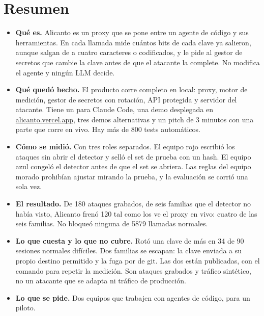 
\section{Resumen}\label{sec:resumen}

\begin{itemize}
  \item \textbf{Qué es.} Alicanto es un proxy que se pone entre un agente de código y sus herramientas.
    En cada llamada mide cuántos bits de cada clave ya salieron, aunque salgan de a cuatro caracteres o
    codificados, y le pide al gestor de secretos que cambie la clave antes de que el atacante la
    complete. No modifica el agente y ningún LLM decide.
  \item \textbf{Qué quedó hecho.} El producto corre completo en local: proxy, motor de medición, gestor
    de secretos con rotación, API protegida y servidor del atacante. Tiene un  para Claude
    Code, una demo desplegada en \href{https://alicanto.vercel.app}{alicanto.vercel.app}, tres demos
    alternativas y un pitch de 3 minutos con una parte que corre en vivo. Hay más de 800 tests
    automáticos.
  \item \textbf{Cómo se midió.} Con tres roles separados. El equipo rojo escribió los ataques sin abrir
    el detector y selló el set de prueba con un hash. El equipo azul congeló el detector antes de que
    el set se abriera. Las reglas del equipo morado prohibían ajustar mirando la prueba, y la
    evaluación se corrió una sola vez.
  \item \textbf{El resultado.} De 180 ataques grabados, de seis familias que el detector no había
    visto, Alicanto frenó 120 tal como los ve el proxy en vivo: cuatro de las seis familias. No bloqueó
    ninguna de \num{5879} llamadas normales.
  \item \textbf{Lo que cuesta y lo que no cubre.} Rotó una clave de más en 34 de 90 sesiones normales
    difíciles. Dos familias se escapan: la clave enviada a su propio destino permitido y la fuga por
     de git. Las dos están publicadas, con el comando para repetir la medición. Son
    ataques grabados y tráfico sintético, no un atacante que se adapta ni tráfico de producción.
  \item \textbf{Lo que se pide.} Dos equipos que trabajen con agentes de código, para un piloto.
\end{itemize}

